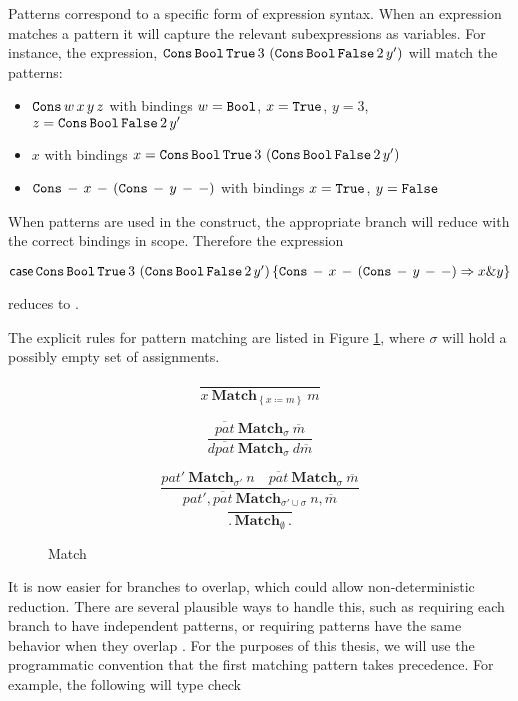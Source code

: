 Patterns correspond to a specific form of expression syntax.
When an expression matches a pattern it will capture the relevant subexpressions as variables.
For instance, the expression,
  $\mathtt{Cons}{}\,\mathtt{Bool}{}\,\mathtt{True}{}\,3\,\left(\mathtt{Cons}{}\,\mathtt{Bool}{}\,\mathtt{False}{}\,2\,y'\right)$
  will match the patterns:
\begin{itemize}
\item $\mathtt{Cons}{}\,w\,x\,y\,z$ with bindings $w=\mathtt{Bool}{}$, $x=\mathtt{True}{}$, $y=3$, $z=\mathtt{Cons}{}\,\mathtt{Bool}{}\,\mathtt{False}{}\,2\,y'$
\item $x$ with bindings $x = \mathtt{Cons}{}\,\mathtt{Bool}{}\,\mathtt{True}{}\,3\,\left(\mathtt{Cons}{}\,\mathtt{Bool}{}\,\mathtt{False}{}\,2\,y'\right)$
\item $\mathtt{Cons}{}\,-\,x\,-\,\left(\mathtt{Cons}{}\,-\,y\,-\,-\right)$ with bindings $x = \mathtt{True}{}$, $y = \mathtt{False}{}$
\end{itemize}
When patterns are used in the \case{} construct, the appropriate branch will reduce with the correct bindings in scope.
Therefore the expression 

$\mathsf{case}{}\,\mathtt{Cons}{}\,\mathtt{Bool}{}\,\mathtt{True}{}\,3\,\left(\mathtt{Cons}{}\,\mathtt{Bool}{}\,\mathtt{False}{}\,2\,y'\right)
 \left\{ \mathtt{Cons}{}\,-\,x\,-\,\left(\mathtt{Cons}{}\,-\,y\,-\,-\right)\Rightarrow x\&y\right\} $

reduces to \False{}.

The explicit rules for pattern matching are listed in Figure \ref{fig:surface-data-match}, where $\sigma$ will hold a possibly empty set of assignments.

\begin{figure}
\[
\frac{\,}{x\ \mathbf{Match}_{\left\{ x\coloneqq m\right\} }\ m}
\]

\[
\frac{\overline{pat}\ \mathbf{Match}_{\sigma}\ \overline{m}}{d\overline{pat}\ \mathbf{Match}_{\sigma}\ d\overline{m}}
\]

\[
\frac{pat'\ \mathbf{Match}_{\sigma'}\ n\quad\overline{pat}\ \mathbf{Match}_{\sigma}\ \overline{m}}{pat',\overline{pat}\ \mathbf{Match}_{\sigma'\cup\sigma}\ n,\overline{m}}
\]
\[
\frac{\,}{.\,\mathbf{Match}_{\emptyset}\,.}
\]

\caption{\SLang{} Match}
\label{fig:surface-data-match}
\end{figure}

It is now easier for \case{} branches to overlap, which could allow non-deterministic reduction.
There are several plausible ways to handle this, such as requiring each branch to have independent patterns, or requiring patterns have the same behavior when they overlap \cite{10.1007/978-3-642-54833-8_6}.
For the purposes of this thesis, we will use the programmatic convention that the first matching pattern takes precedence.
For example, the following will type check

